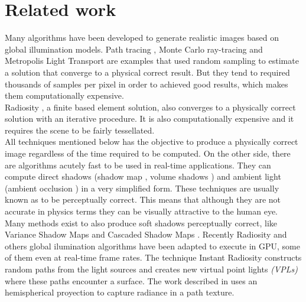 \documentclass[10pt, conference]{IEEEtran}
\begin{document}
\section{Related work}
%
Many algorithms have been developed to generate realistic images based on global illumination models. 
Path tracing \cite{The_rendering_equation}, Monte Carlo ray-tracing \cite{Montecarlo_Ray_tracing} and Metropolis Light Transport \cite{Metropolis_light_transport} are examples that used random sampling to 
estimate a solution that converge to a physical correct result. But they tend to required thousands of samples per pixel in order to 
achieved good results, which makes them computationally expensive.\\

Radiosity \cite{radiosity}, a finite based element solution, also converges to a physically correct solution with an iterative procedure. 
It is also computationally expensive and it requires the scene to be fairly tessellated.\\ 

All techniques mentioned below has the objective to produce a physically correct image regardless of the time required to be computed.
On the other side, there are algorithms acutely fast to be used in real-time applications. 
They can compute direct shadows (shadow map \cite{shadow_map}, volume shadows \cite{real_time_shadows}) and ambient light (ambient occlusion \cite{ambient_occlusion}) 
in a very simplified form. These techniques are usually known as to be perceptually correct.
This means that although they are not accurate in physics terms they can be visually attractive to the human eye.\\

Many methods exist to also produce soft shadows perceptually correct, like Variance Shadow Maps \cite{shadow_map} and Cascaded Shadow Maps \cite{real_time_shadows}.
Recently Radiosity and others global ilumination algorithms have been adapted to execute in GPU, some of them even at real-time frame rates.
The technique Instant Radiosity \cite{instant_radiosity} constructs random paths from the light sources and creates new virtual point lights \emph{(VPLs)} where these paths encounter a surface.
The work described in \cite{gpu_gems_2} uses an hemispherical proyection to capture radiance in a path texture.





\end{document}
